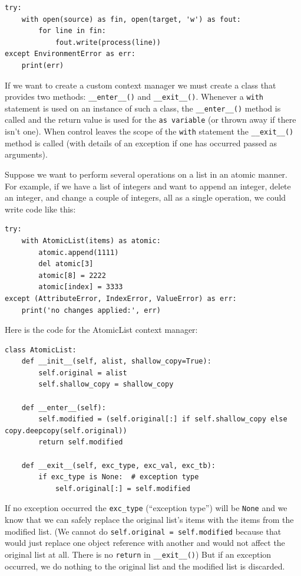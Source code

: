 \begin{lstlisting}
try:
    with open(source) as fin, open(target, 'w') as fout:
        for line in fin:
            fout.write(process(line))
except EnvironmentError as err:
    print(err)  
\end{lstlisting}



If we want to create a custom context manager we must create a class that provides two methods: \verb|__enter__()| and \verb|__exit__()|.
Whenever a \verb|with| statement is used on an instance of such a class, the \verb|__enter__()| method is called and the return value is used for the \verb|as variable| (or thrown away if there isn’t one).
When control leaves the scope of the \verb|with| statement the \verb|__exit__()| method is called (with details of an exception if one has occurred passed as arguments).



Suppose we want to perform several operations on a list in an atomic manner.
For example, if we have a list of integers and want to append an integer, delete an integer, and change a couple of integers, all as a single operation, we could write code like this:
\begin{lstlisting}
try:
    with AtomicList(items) as atomic:
        atomic.append(1111)
        del atomic[3]
        atomic[8] = 2222
        atomic[index] = 3333
except (AttributeError, IndexError, ValueError) as err:
    print('no changes applied:', err)  
\end{lstlisting}


Here is the code for the AtomicList context manager:
\begin{lstlisting}
class AtomicList:
    def __init__(self, alist, shallow_copy=True):
        self.original = alist
        self.shallow_copy = shallow_copy

    def __enter__(self):
        self.modified = (self.original[:] if self.shallow_copy else copy.deepcopy(self.original))
        return self.modified

    def __exit__(self, exc_type, exc_val, exc_tb):
        if exc_type is None:  # exception type
            self.original[:] = self.modified  
\end{lstlisting}


If no exception occurred the \verb|exc_type| (``exception type'') will be \verb|None| and we know that we can safely replace the original list’s items with the items from the modified list.
(We cannot do \verb|self.original = self.modified| because that would just replace one object reference with another and would not affect the original list at all.
There is no \verb|return| in \verb|__exit__()|)
But if an exception occurred, we do nothing to the original list and the modified list is discarded.



